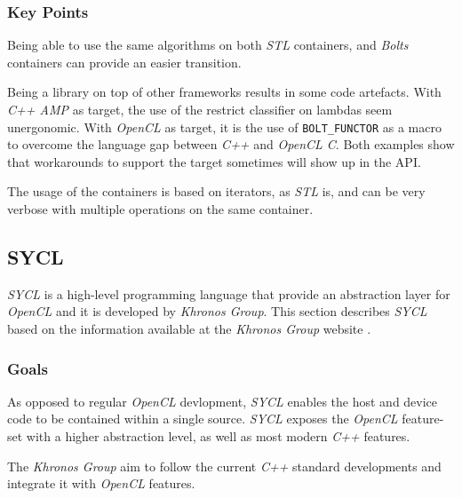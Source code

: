 \subsubsection{Key Points}
Being able to use the same algorithms on both \textit{STL} containers, and \textit{Bolts} containers can provide an easier transition.

Being a library on top of other frameworks results in some code artefacts. With \textit{C++ AMP} as target, the use of the restrict classifier on lambdas seem unergonomic. With \textit{OpenCL} as target, it is the use of \texttt{BOLT\_FUNCTOR} as a macro to overcome the language gap between \textit{C++} and \textit{OpenCL C}. Both examples show that workarounds to support the target sometimes will show up in the API. 

The usage of the containers is based on iterators, as \textit{STL} is, and can be very verbose with multiple operations on the same container.


\subsection{SYCL}
\textit{SYCL} is a high-level programming language that provide an abstraction layer for \textit{OpenCL} and it is developed by \textit{Khronos Group}. This section describes \textit{SYCL} based on the information available at the \textit{Khronos Group} website \cite{khronosSYCL}.

\subsubsection{Goals}
As opposed to regular \textit{OpenCL} devlopment, \textit{SYCL} enables the host and device code to be contained within a single source. \textit{SYCL} exposes the \textit{OpenCL} feature-set with a higher abstraction level, as well as most modern \textit{C++} features. 

The \textit{Khronos Group} aim to follow the current \textit{C++} standard developments and integrate it with \textit{OpenCL} features.

